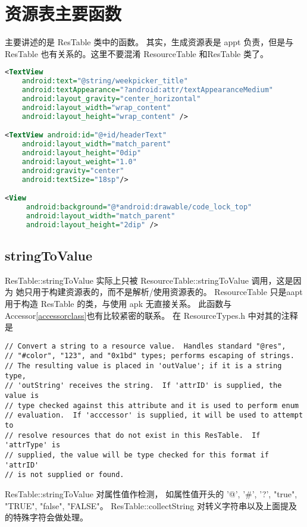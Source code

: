 \documentclass[a4paper,11pt]{article}
\begin{document}
\section{资源表主要函数}
主要讲述的是 ResTable 类中的函数。
其实，生成资源表是 appt 负责，但是与 ResTable 也有关系的。这里不要混淆
ResourceTable 和ResTable 类了。
\begin{lstlisting}[language=xml,label=xmlexam,caption={Android XML 举例}]
<TextView
    android:text="@string/weekpicker_title"
    android:textAppearance="?android:attr/textAppearanceMedium"
    android:layout_gravity="center_horizontal"
    android:layout_width="wrap_content"
    android:layout_height="wrap_content" />

<TextView android:id="@+id/headerText"
    android:layout_width="match_parent"
    android:layout_height="0dip"
    android:layout_weight="1.0"
    android:gravity="center"
    android:textSize="18sp"/>

<View
     android:background="@*android:drawable/code_lock_top"
     android:layout_width="match_parent"
     android:layout_height="2dip" />
\end{lstlisting}
\subsection {stringToValue}\label{strtovalue}
ResTable::stringToValue 实际上只被 ResourceTable::stringToValue 调用，这是因为
她只用于构建资源表的，而不是解析/使用资源表的。 ResourceTable 只是aapt用于构造
ResTable 的类，与使用 apk 无直接关系。
此函数与Accessor\cref{accessorclass}也有比较紧密的联系。
在 ResourceTypes.h 中对其的注释是
\begin{verbatim}
// Convert a string to a resource value.  Handles standard "@res",
// "#color", "123", and "0x1bd" types; performs escaping of strings.
// The resulting value is placed in 'outValue'; if it is a string type,
// 'outString' receives the string.  If 'attrID' is supplied, the value is
// type checked against this attribute and it is used to perform enum
// evaluation.  If 'acccessor' is supplied, it will be used to attempt to
// resolve resources that do not exist in this ResTable.  If 'attrType' is
// supplied, the value will be type checked for this format if 'attrID'
// is not supplied or found.
\end{verbatim}

ResTable::stringToValue 对属性值作检测， 如属性值开头的
'@', '\#', '?', "true", "TRUE", "false", "FALSE"。
ResTable::collectString 对转义字符串以及上面提及的特殊字符会做处理。
\end{document}
